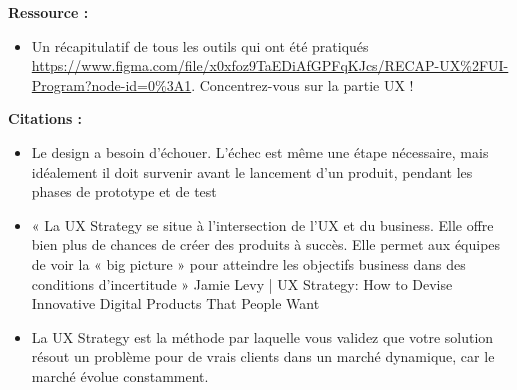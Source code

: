 \textbf{Ressource :}

\begin{itemize}
\item Un récapitulatif de tous les outils qui ont été pratiqués \url{https://www.figma.com/file/x0xfoz9TaEDiAfGPFqKJcs/RECAP-UX%2FUI-Program?node-id=0%3A1}. Concentrez-vous sur la partie UX !
\end{itemize}

\textbf{Citations :}

\begin{itemize}
\item Le design a besoin d'échouer. L'échec est même une étape nécessaire, mais idéalement il doit survenir avant le lancement d'un produit, pendant les phases de prototype et de test
\item « La UX Strategy se situe à l'intersection de l'UX et du business. Elle offre bien plus de chances de créer des produits à succès. Elle permet aux équipes de voir la « big picture » pour atteindre les objectifs business dans des conditions d'incertitude » Jamie Levy | UX Strategy: How to Devise Innovative Digital Products That People Want
\item La UX Strategy est la méthode par laquelle vous validez que votre solution résout un problème pour de vrais clients dans un marché dynamique, car le marché évolue constamment.
\end{itemize}

